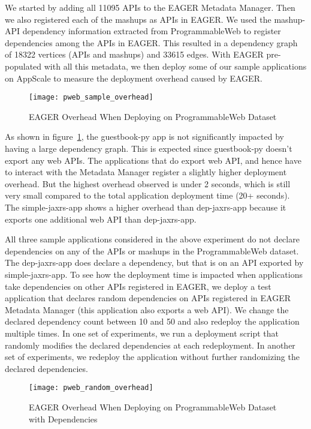 We started by adding all 11095 APIs to the EAGER Metadata Manager. Then we also registered each of the mashups as APIs in EAGER. We used the
mashup-API dependency information extracted from ProgrammableWeb to register dependencies among the APIs in EAGER. This resulted in a 
dependency graph of 18322 vertices (APIs and mashups) and 33615 edges. With EAGER pre-populated with all this metadata, we then deploy
some of our sample applications on AppScale to measure the deployment overhead caused by EAGER.

\begin{figure}
\centering
\texttt{[image: pweb\_sample\_overhead]}
\caption{EAGER Overhead When Deploying on ProgrammableWeb Dataset}
\label{fig:pweb_sample_overhead}
\end{figure}

As shown in figure~\ref{fig:pweb_sample_overhead}, the guestbook-py app is not significantly impacted by having a large dependency graph. This is
expected since guestbook-py doesn't export any web APIs. The applications that do export web API, and hence have to interact with the Metadata
Manager register a slightly higher deployment overhead. But the highest overhead observed is under 2 seconds, which is still very small compared
to the total application deployment time (20+ seconds). The simple-jaxrs-app shows a higher overhead than dep-jaxrs-app because it exports one
additional web API than dep-jaxrs-app. 

All three sample applications considered in the above experiment do not declare dependencies on any of the APIs or mashups in the ProgrammableWeb
dataset. The dep-jaxrs-app does declare a dependency, but that is on an API exported by simple-jaxrs-app. To see how the deployment time is impacted
when applications take dependencies on other APIs registered in EAGER, we deploy a test application that declares random dependencies on APIs
registered in EAGER Metadata Manager (this application also exports a web API). We change the declared dependency count between 
10 and 50 and also redeploy the application multiple times.
In one set of experiments, we run a deployment script that randomly modifies the declared dependencies at each redeployment. In another set of 
experiments, we redeploy the application without further randomizing the declared dependencies.

\begin{figure}
\centering
\texttt{[image: pweb\_random\_overhead]}
\caption{EAGER Overhead When Deploying on ProgrammableWeb Dataset with Dependencies}
\label{fig:pweb_random_overhead}
\end{figure}

